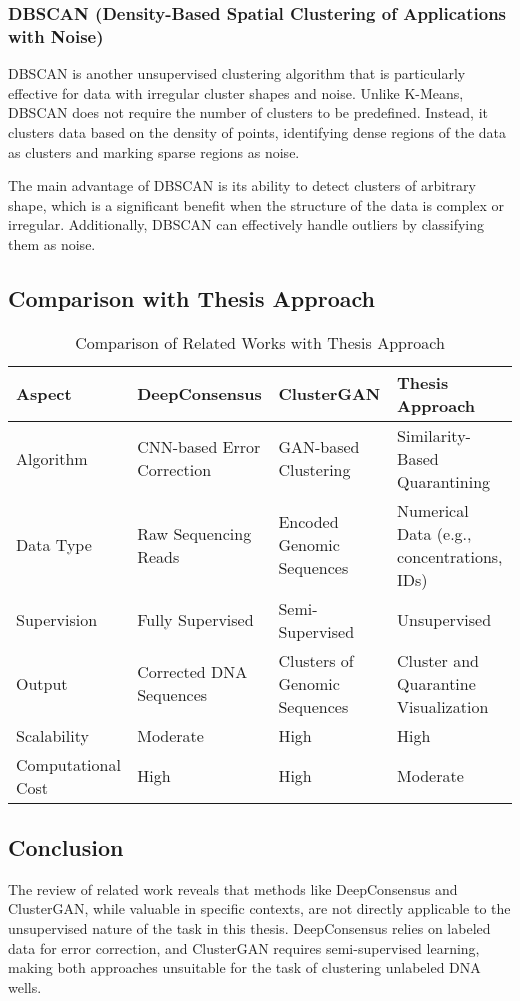 \subsubsection{DBSCAN (Density-Based Spatial Clustering of Applications with Noise)}
DBSCAN is another unsupervised clustering algorithm that is particularly effective for data with irregular cluster shapes and noise. Unlike K-Means, DBSCAN does not require the number of clusters to be predefined. Instead, it clusters data based on the density of points, identifying dense regions of the data as clusters and marking sparse regions as noise.

The main advantage of DBSCAN is its ability to detect clusters of arbitrary shape, which is a significant benefit when the structure of the data is complex or irregular. Additionally, DBSCAN can effectively handle outliers by classifying them as noise.

\subsection{Comparison with Thesis Approach}
    \begin{table}[h]
        \centering
        \caption{Comparison of Related Works with Thesis Approach}
        \label{tab:comparison}
        \begin{tabular}{|p{3cm}|p{3cm}|p{3cm}|p{3cm}|}
        \hline
        \textbf{Aspect} & \textbf{DeepConsensus} & \textbf{ClusterGAN} & \textbf{Thesis Approach} \\ \hline
        Algorithm & CNN-based Error Correction & GAN-based Clustering & Similarity-Based Quarantining \\ \hline
        Data Type & Raw Sequencing Reads & Encoded Genomic Sequences & Numerical Data (e.g., concentrations, IDs) \\ \hline
        Supervision & Fully Supervised & Semi-Supervised & Unsupervised \\ \hline
        Output & Corrected DNA Sequences & Clusters of Genomic Sequences & Cluster and Quarantine Visualization \\ \hline
        Scalability & Moderate & High & High \\ \hline
        Computational Cost & High & High & Moderate \\ \hline
        \end{tabular}
        \end{table}


\subsection{Conclusion}
The review of related work reveals that methods like DeepConsensus and ClusterGAN, while valuable in specific contexts, are not directly applicable to the unsupervised nature of the task in this thesis. DeepConsensus relies on labeled data for error correction, and ClusterGAN requires semi-supervised learning, making both approaches unsuitable for the task of clustering unlabeled DNA wells.


